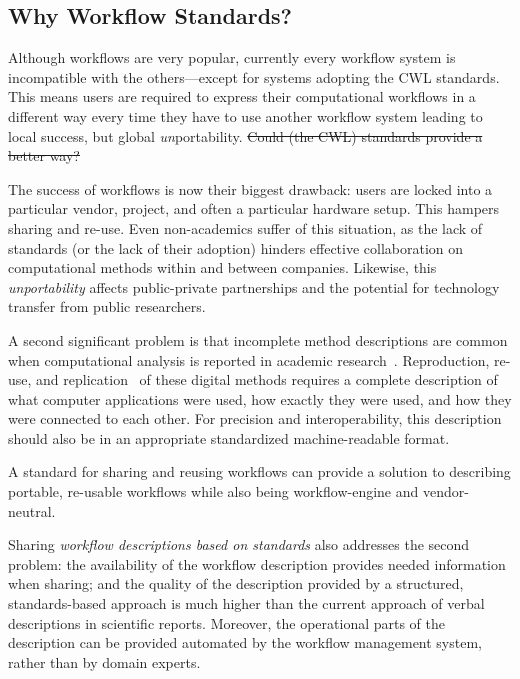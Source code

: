 \documentclass[sigconf,revew,screen,timestamp,nonacm]{acmart}
\newcommand{\addition}[1]{{\color{brown} #1}}
\newcommand{\deletion}[1]{{\color{red} \sout{#1}}}
\begin{document}
\subsection{Why Workflow Standards?}\label{sec:bg:standard}

Although workflows are very popular, currently every workflow system is incompatible with the others---except for systems adopting the CWL standards. This means users are required to express their computational workflows in a different way every time they have to use another workflow system leading to local success, but global \textit{un}portability. \deletion{Could (the CWL) standards provide a better way?}

The success of workflows is now their biggest drawback: users are locked into a particular vendor, project, and often a particular hardware setup. This hampers sharing and re-use. Even non-academics suffer of this situation, as the lack of standards (or the lack of their adoption) hinders effective collaboration on computational methods within and between companies. Likewise, this \textit{unportability} affects public-private partnerships and the potential for technology transfer from public researchers.

\addition{A second significant problem is that incomplete method descriptions are common when computational analysis is reported in academic research~\cite{ivie_reproducibility_2018}. Reproduction, re-use, and replication~\cite{feitelson_repeatability_2015} of these digital methods requires a complete description of what computer applications were used, how exactly they were used, and how they were connected to each other. For precision and interoperability, this description should also be in an appropriate standardized machine-readable format.}

A standard for sharing and reusing workflows can provide a solution to describing portable, re-usable workflows while also being workflow-engine and vendor-neutral.

\addition{Sharing \textit{workflow descriptions based on standards} also addresses the second problem: the availability of the workflow description provides needed information when sharing; and the quality of the description provided by a structured, standards-based approach is much higher than the current approach of verbal descriptions in scientific reports. Moreover, the operational parts of the description can be provided automated by the workflow management system, rather than by domain experts.}
\end{document}
